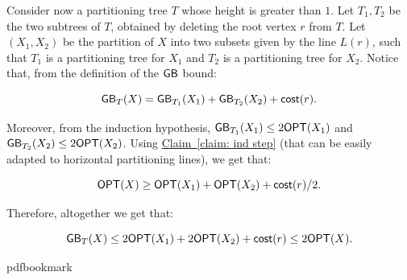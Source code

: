 \documentclass[11pt]{article}
\numberwithin{equation}{section}
\theoremstyle{definition}
\theoremstyle{plain}
\newcommand{\expref}[2]{\hyperref[#2]{#1~\ref{#2}}}
\begin{document}
Consider now a partitioning tree $T$ whose height is greater than $1$. Let $T_1,T_2$ be the two subtrees of $T$, obtained by deleting the root vertex $r$ from $T$. Let $(X_1,X_2)$ be the partition of $X$ into two subsets given by the line $L(r)$, such that $T_1$ is a partitioning tree for $X_1$ and $T_2$ is a partitioning tree for $X_2$. Notice that, from the definition of the $\mathsf{GB}$ bound:

\[\mathsf{GB}_T(X)=\mathsf{GB}_{T_1}(X_1)+\mathsf{GB}_{T_2}(X_2)+\mathsf{cost}(r).\]

Moreover, from the induction hypothesis, $\mathsf{GB}_{T_1}(X_1)\leq 2\mbox{\sf OPT}(X_1)$ and $\mathsf{GB}_{T_2}(X_2)\leq 2\mbox{\sf OPT}(X_2)$.
Using \expref{Claim}{claim: ind step} (that can be easily adapted to horizontal partitioning lines), we get that:


\[\mbox{\sf OPT}(X)\geq \mbox{\sf OPT}(X_1)+\mbox{\sf OPT}(X_2)+\mathsf{cost}(r)/2.\]

Therefore, altogether we get that:


\[\mathsf{GB}_T(X)\leq 2\mbox{\sf OPT}(X_1)+2\mbox{\sf OPT}(X_2)+\mathsf{cost}(r)\leq 2\mbox{\sf OPT}(X).  \]

\nocite{conf-version}

\newcommand{\prelim}{Preliminary version in\ }\newcommand{\prelims}{Preliminary
  versions in\ }
\providecommand{\bibhead}[1]{}
\expandafter\ifx\csname pdfbookmark\endcsname\relax%
  \providecommand{\tocrefpdfbookmark}{}
\else\providecommand{\tocrefpdfbookmark}{%
   \hypertarget{tocreferences}{}%
   \pdfbookmark[1]{References}{tocreferences}}%
\fi
\end{document}
